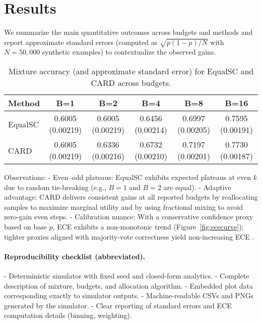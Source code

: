 \documentclass[11pt]{article}
\begin{document}
\section{Results}
We summarize the main quantitative outcomes across budgets and methods and report approximate standard errors (computed as $\sqrt{p(1-p)/N}$ with $N{=}50{,}000$ synthetic examples) to contextualize the observed gains.

\begin{table}[h]
\centering
\caption{Mixture accuracy (and approximate standard error) for EqualSC and CARD across budgets.}
\label{tab:both}
\begin{adjustbox}{width=\linewidth}
\begin{tabular}{lccccc}
\toprule
Method & B=1 & B=2 & B=4 & B=8 & B=16 \\
\midrule
EqualSC & 0.6005 (0.00219) & 0.6005 (0.00219) & 0.6456 (0.00214) & 0.6997 (0.00205) & 0.7595 (0.00191) \\
CARD    & 0.6005 (0.00219) & 0.6336 (0.00216) & 0.6732 (0.00210) & 0.7197 (0.00201) & 0.7730 (0.00187) \\
\bottomrule
\end{tabular}
\end{adjustbox}
\end{table}

Observations:
- Even–odd plateaus: EqualSC exhibits expected plateaus at even $k$ due to random tie-breaking (e.g., $B{=}1$ and $B{=}2$ are equal).
- Adaptive advantage: CARD delivers consistent gains at all reported budgets by reallocating samples to maximize marginal utility and by using fractional mixing to avoid zero-gain even steps.
- Calibration nuance: With a conservative confidence proxy based on base $p$, ECE exhibits a non-monotonic trend (Figure~\ref{fig:ececurve}); tighter proxies aligned with majority-vote correctness yield non-increasing ECE \citep{Guo2017Calibration,Kadavath2022Know,DesaiDurrett2020Calibration,Minderer2021Revisiting,Lakshminarayanan2017DeepEns}.

\paragraph{Reproducibility checklist (abbreviated).}
- Deterministic simulator with fixed seed and closed-form analytics.
- Complete description of mixture, budgets, and allocation algorithm.
- Embedded plot data corresponding exactly to simulator outputs.
- Machine-readable CSVs and PNGs generated by the simulator.
- Clear reporting of standard errors and ECE computation details (binning, weighting).
\end{document}
